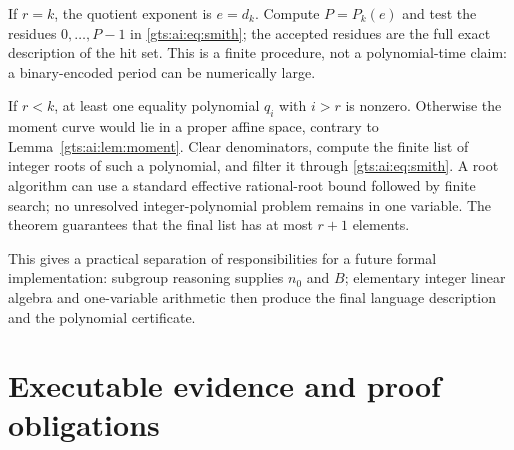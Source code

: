 \documentclass[11pt,letterpaper]{article}
\theoremstyle{definition}
\theoremstyle{remark}
\begin{document}
If $r=k$, the quotient exponent is $e=d_k$. Compute $P=P_k(e)$ and test the residues $0,\ldots,P-1$ in \eqref{gts:ai:eq:smith}; the accepted residues are the full exact description of the hit set. This is a finite procedure, not a polynomial-time claim: a binary-encoded period can be numerically large.

If $r<k$, at least one equality polynomial $q_i$ with $i>r$ is nonzero. Otherwise the moment curve would lie in a proper affine space, contrary to Lemma~\ref{gts:ai:lem:moment}. Clear denominators, compute the finite list of integer roots of such a polynomial, and filter it through \eqref{gts:ai:eq:smith}. A root algorithm can use a standard effective rational-root bound followed by finite search; no unresolved integer-polynomial problem remains in one variable. The theorem guarantees that the final list has at most $r+1$ elements.

This gives a practical separation of responsibilities for a future formal implementation: subgroup reasoning supplies $n_0$ and $B$; elementary integer linear algebra and one-variable arithmetic then produce the final language description and the polynomial certificate.

\section{Executable evidence and proof obligations}\label{gts:ai:sec:verification}
\end{document}
